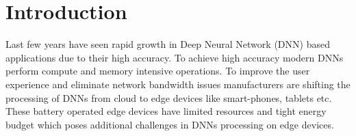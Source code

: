 \documentclass[a4paper,10pt]{article}
\begin{document}

\newpage
\setcounter{tocdepth}{2}
\tableofcontents
\newpage

\section{Introduction}
Last few years have seen rapid growth in Deep Neural Network (DNN) based applications due to their high accuracy. To achieve high accuracy modern DNNs perform compute and memory intensive operations. To improve the user experience and eliminate network bandwidth issues manufacturers are shifting the processing of DNNs from cloud to edge devices like smart-phones, tablets etc. These battery operated edge devices have limited resources and tight energy budget which poses additional challenges in DNNs processing on edge devices. 
\end{document}
